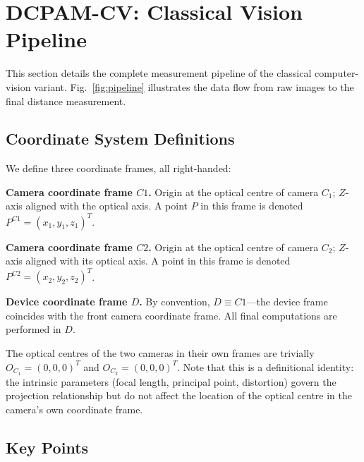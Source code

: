 \section{DCPAM-CV: Classical Vision Pipeline}

This section details the complete measurement pipeline
of the classical computer-vision variant.
%
Fig.~\ref{fig:pipeline} illustrates the data flow from raw
images to the final distance measurement.



\subsection{Coordinate System Definitions}
\label{sec:coord}

We define three coordinate frames, all right-handed:

\textbf{Camera coordinate frame $C1$.}
Origin at the optical centre of camera $C_1$;
$Z$-axis aligned with the optical axis.
%
A point $P$ in this frame is denoted
$P^{C1} = (x_1, y_1, z_1)^T$.

\textbf{Camera coordinate frame $C2$.}
Origin at the optical centre of camera $C_2$;
$Z$-axis aligned with its optical axis.
%
A point in this frame is denoted
$P^{C2} = (x_2, y_2, z_2)^T$.

\textbf{Device coordinate frame $D$.}
By convention, $D \equiv C1$---the device frame coincides
with the front camera coordinate frame.
%
All final computations are performed in $D$.

The optical centres of the two cameras in their own frames are
trivially
$O_{C_1} = (0,0,0)^T$ and $O_{C_2} = (0,0,0)^T$.
%
Note that this is a definitional identity:
the intrinsic parameters (focal length, principal point,
distortion) govern the projection relationship but do not
affect the location of the optical centre in the camera's
own coordinate frame.


\subsection{Key Points}
\label{sec:keypoints}

